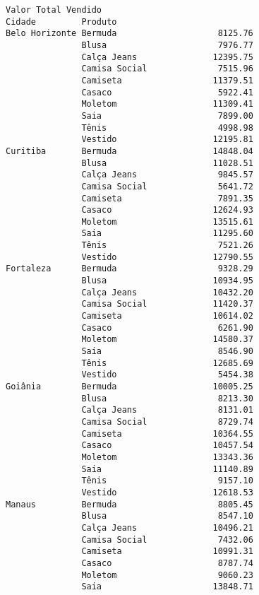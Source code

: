 \documentclass[11pt]{article}
\begin{document}
    
    \begin{Verbatim}[commandchars=\\\{\}]
                              Valor Total Vendido
Cidade         Produto                           
Belo Horizonte Bermuda                    8125.76
               Blusa                      7976.77
               Calça Jeans               12395.75
               Camisa Social              7515.96
               Camiseta                  11379.51
               Casaco                     5922.41
               Moletom                   11309.41
               Saia                       7899.00
               Tênis                      4998.98
               Vestido                   12195.81
Curitiba       Bermuda                   14848.04
               Blusa                     11028.51
               Calça Jeans                9845.57
               Camisa Social              5641.72
               Camiseta                   7891.35
               Casaco                    12624.93
               Moletom                   13515.61
               Saia                      11295.60
               Tênis                      7521.26
               Vestido                   12790.55
Fortaleza      Bermuda                    9328.29
               Blusa                     10934.95
               Calça Jeans               10432.20
               Camisa Social             11420.37
               Camiseta                  10614.02
               Casaco                     6261.90
               Moletom                   14580.37
               Saia                       8546.90
               Tênis                     12685.69
               Vestido                    5454.38
Goiânia        Bermuda                   10005.25
               Blusa                      8213.30
               Calça Jeans                8131.01
               Camisa Social              8729.74
               Camiseta                  10364.55
               Casaco                    10457.54
               Moletom                   13343.36
               Saia                      11140.89
               Tênis                      9157.10
               Vestido                   12618.53
Manaus         Bermuda                    8805.45
               Blusa                      8547.10
               Calça Jeans               10496.21
               Camisa Social              7432.06
               Camiseta                  10991.31
               Casaco                     8787.74
               Moletom                    9060.23
               Saia                      13848.71

\end{Verbatim}
\end{document}
